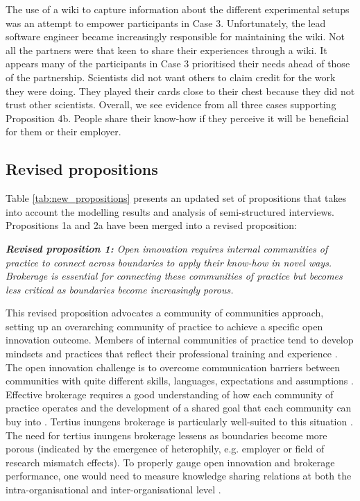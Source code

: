 The use of a wiki to capture information about the different experimental setups was an attempt to empower participants in Case 3. Unfortunately, the lead software engineer became increasingly responsible for maintaining the wiki. Not all the partners were that keen to share their experiences through a wiki. It appears many of the participants in Case 3 prioritised their needs ahead of those of the partnership. Scientists did not want others to claim credit for the work they were doing. They played their cards close to their chest because they did not trust other scientists. Overall, we see evidence from all three cases supporting Proposition 4b. People share their know-how if they perceive it will be beneficial for them or their employer.

\subsection{Revised propositions}

Table \ref{tab:new_propositions} presents an updated set of propositions that takes into account the modelling results and analysis of semi-structured interviews. Propositions 1a and 2a have been merged into a revised proposition: \bigskip

\begin{tcolorbox}
\textit{\textbf{Revised proposition 1:} Open innovation requires internal communities of practice to connect across boundaries to apply their know-how in novel ways. Brokerage is essential for connecting these communities of practice but becomes less critical as boundaries become increasingly porous.} 
\end{tcolorbox}

This revised proposition advocates a community of communities approach, setting up an overarching community of practice to achieve a specific open innovation outcome. Members of internal communities of practice tend to develop mindsets and practices that reflect their professional training and experience \citep{garrety2004integrating}. The open innovation challenge is to overcome communication barriers between communities with quite different skills, languages, expectations and assumptions \citep{chesbrough2012open}. Effective brokerage requires a good understanding of how each community of practice operates and the development of a shared goal that each community can buy into \citep{garrety2004integrating}. Tertius inungens brokerage is particularly well-suited to this situation \citep{obstfeld2014brokerage, quintane2016brokers, grosser2019measuring}. The need for tertius inungens brokerage lessens as boundaries become more porous (indicated by the emergence of heterophily, e.g. employer or field of research mismatch effects). To properly gauge open innovation and brokerage performance, one would need to measure knowledge sharing relations at both the intra-organisational and inter-organisational level \citep[e.g.][]{jasny2015two}. \medskip

